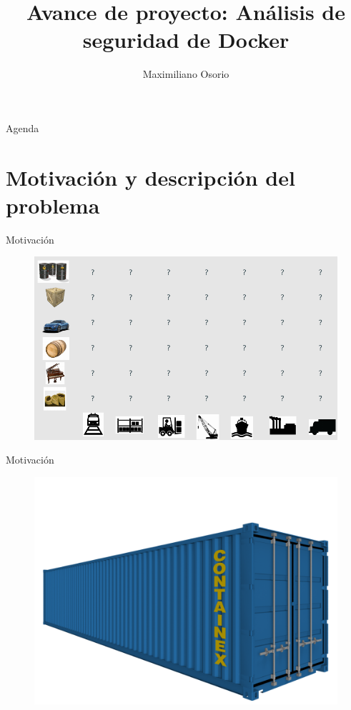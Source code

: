 \documentclass{bredelebeamer}
\title[Seminario de Arquitecturas de Sistemas Distribuidos]{Avance de proyecto: Análisis de seguridad de Docker}
\author{Maximiliano Osorio}
\institute[UTFSM]
{
}
\date{}
\begin{document}
\nocite{*}
\begin{frame}
  \titlepage
\end{frame}



\begin{frame}{Agenda}
  \tableofcontents
\end{frame}



\section{Motivación y descripción del problema}
	

\begin{frame}{Motivación}
	\begin{figure}
		\centering
\includegraphics[width=\textwidth,height=0.8\textheight,keepaspectratio]{images/another}
	\end{figure}
\end{frame}

\begin{frame}{Motivación}
	\begin{figure}
		\centering
\includegraphics[width=\textwidth,height=0.8\textheight,keepaspectratio]{images/r_container}
	\end{figure}
\end{frame}
\end{document}

